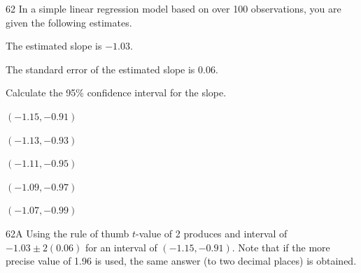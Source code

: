 \begin{question}{62}
In a simple linear regression model based on over 100 observations, you are given the following estimates.
\begin{given}
\item The estimated slope is $-1.03$.
\item The standard error of the estimated slope is 0.06.
\end{given}

Calculate the 95\% confidence interval for the slope.

\begin{choices}
\item $(-1.15, -0.91)$
\item $(-1.13, -0.93)$
\item $(-1.11, -0.95)$
\item $(-1.09, -0.97)$
\item $(-1.07, -0.99)$
\end{choices}
\end{question}
\begin{solution}{62}{A}
Using the rule of thumb $t$-value of 2 produces and interval of $-1.03 \pm 2(0.06)$ for an interval of $(-1.15, -0.91)$. Note that if the more precise value of 1.96 is used, the same answer (to two decimal places) is obtained.
\end{solution}

